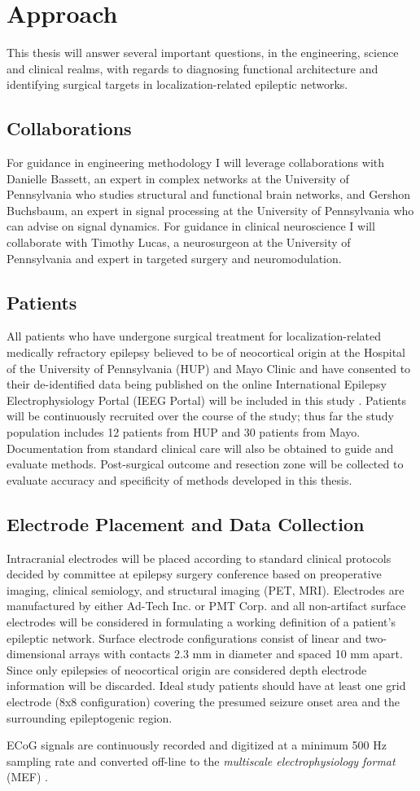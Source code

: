\section{Approach}
This thesis will answer several important questions, in the engineering, science and clinical realms, with regards to diagnosing functional architecture and identifying surgical targets in localization-related epileptic networks.

\subsection{Collaborations}
For guidance in engineering methodology I will leverage collaborations with Danielle Bassett, an expert in complex networks at the University of Pennsylvania who studies structural and functional brain networks, and Gershon Buchsbaum, an expert in signal processing at the University of Pennsylvania who can advise on signal dynamics. For guidance in clinical neuroscience I will collaborate with Timothy Lucas, a neurosurgeon at the University of Pennsylvania and expert in targeted surgery and neuromodulation.

\subsection{Patients}
All patients who have undergone surgical treatment for localization-related medically refractory epilepsy believed to be of neocortical origin at the Hospital of the University of Pennsylvania (HUP) and Mayo Clinic and have consented to their de-identified data being published on the online International Epilepsy Electrophysiology Portal (IEEG Portal) will be included in this study \cite{wagenaar2013multimodal}. Patients will be continuously recruited over the course of the study; thus far the study population includes 12 patients from HUP and 30 patients from Mayo. Documentation from standard clinical care will also be obtained to guide and evaluate methods. Post-surgical outcome and resection zone will be collected to evaluate accuracy and specificity of methods developed in this thesis.

\subsection{Electrode Placement and Data Collection}
Intracranial electrodes will be placed according to standard clinical protocols decided by committee at epilepsy surgery conference based on preoperative imaging, clinical semiology, and structural imaging (PET, MRI). Electrodes are manufactured by either Ad-Tech Inc. or PMT Corp. and all non-artifact surface electrodes will be considered in formulating a working definition of a patient's epileptic network. Surface electrode configurations consist of linear and two-dimensional arrays with contacts 2.3 mm in diameter and spaced 10 mm apart. Since only epilepsies of neocortical origin are considered depth electrode information will be discarded. Ideal study patients should have at least one grid electrode (8x8 configuration) covering the presumed seizure onset area and the surrounding epileptogenic region.

ECoG signals are continuously recorded and digitized at a minimum 500 Hz sampling rate and converted off-line to the \textit{multiscale electrophysiology format} (MEF) \cite{brinkmann2009large-scale}.
